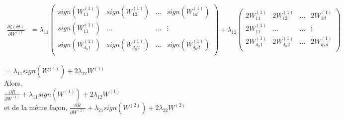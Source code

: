 \documentclass[12pt]{article}
\begin{document}
\begin{align*} 
\frac{\partial \zeta(\Theta)}{\partial W^{(1)}} &= \lambda_{11}
	\left (
     \begin{array}{rrrr}
       sign(W_{11}^{(1)}) & sign(W_{12}^{(1)}) & \dots & sign(W_{1d}^{(1)})\\
        sign(W_{11}^{(1)}) & \dots  & \dots & \vdots\\ 
 	sign(W_{d_{h}1}^{(1)}) & sign(W_{d_{h}2}^{(1)}) & \dots & sign(W_{d_{h}d}^{(1)})\\
       \end{array}
     \right) + \lambda_{12}
	\left (
     \begin{array}{rrrr}
       2W_{11}^{(1)} & 2W_{12}^{(1)} & \dots & 2W_{1d}^{(1)}\\
        2W_{11}^{(1)} & \dots  & \dots & \vdots\\ 
 	2W_{d_{h}1}^{(1)} & 2W_{d_{h}2}^{(1)} & \dots & 2W_{d_{h}d}^{(1)}\\
       \end{array}
     \right)
\end{align*}

$ = \lambda_{11} sign(W^{(1)}) + 2\lambda_{12}W^{(1)}$ \\

Alors,\\
$\frac{\partial \tilde{R}}{\partial W^{(1)}} + \lambda_{11} sign(W^{(1)}) + 2\lambda_{12}W^{(1)}$\\

et de la même façon, $\frac{\partial \tilde{R}}{\partial W^{(2)}} + \lambda_{21} sign(W^{(2)}) + 2\lambda_{22}W^{(2)}$ 
\end{document}
